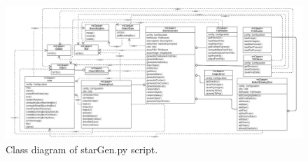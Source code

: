 \begin{figure}[H]
    \centering
    \includegraphics[width=\textwidth]{images/starGenClass3.jpg}
    \caption{Class diagram of starGen.py script.}
    \label{img:starGenClass}
\end{figure}


